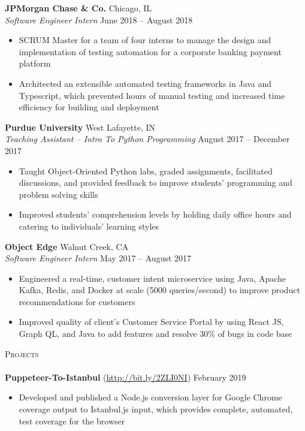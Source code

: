 \documentclass[letterpaper, 10pt]{article}
\newcommand{\lineunder} {
    \vspace*{-8pt} \\
    \hspace*{-18pt} \hrulefill \\
}
\newcommand{\header} [1] {
    {
        \hspace*{-18pt}\vspace*{6pt}
        {\large\textsc{#1}}
    }
    \vspace*{-6pt} \lineunder
}
\begin{document}
\textbf{JPMorgan Chase \& Co.} \hfill Chicago, IL\\
\textit{Software Engineer Intern} \hfill June 2018 -- August 2018\\
\vspace{-1mm}
\begin{itemize} \itemsep 1pt
	\item SCRUM Master for a team of four interns to manage the design and implementation of testing automation for a corporate banking payment platform
	\item Architected an extensible automated testing frameworks in Java and Typescript, which prevented hours of manual testing and increased time efficiency for building and deployment
\end{itemize}

\textbf{Purdue University} \hfill West Lafayette, IN\\
\textit{Teaching Assistant -- Intro To Python Programming} \hfill August 2017 -- December 2017\\
\vspace{-1mm}
\begin{itemize} \itemsep 1pt
	\item Taught Object-Oriented Python labs, graded assignments, facilitated discussions, and provided feedback to improve students’ programming and problem solving skills
	\item Improved students’ comprehension levels by holding daily office hours and catering to individuals’ learning styles
\end{itemize}

\textbf{Object Edge} \hfill Walnut Creek, CA\\
\textit{Software Engineer Intern} \hfill May 2017 -- August 2017\\
\vspace{-1mm}
\begin{itemize} \itemsep 1pt
	\item Engineered a real-time, customer intent microservice using Java, Apache Kafka, Redis, and Docker at scale (5000 queries/second) to improve product recommendations for customers
	\item Improved quality of client’s Customer Service Portal by using React JS, Graph QL, and Java to add features and resolve 30\% of bugs in code base
\end{itemize}

\header{Projects}
{\textbf{Puppeteer-To-Istanbul}} (\href{http://bit.ly/2ZLI0NI}{http://bit.ly/2ZLI0NI}) \hfill February 2019\\
\vspace{-1mm}
\begin{itemize} \itemsep 1pt
	\item Developed and published a Node.js conversion layer for Google Chrome coverage output to Istanbul.js input, which provides complete, automated, test coverage for the browser
\end{itemize}
\vspace*{2mm}
\end{document}

